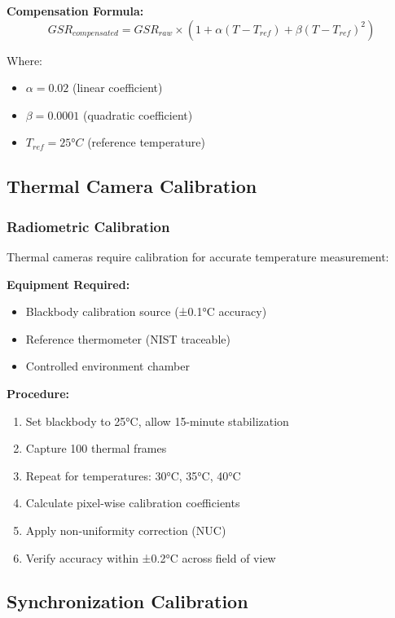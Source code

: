 \textbf{Compensation Formula:}
\begin{equation}
GSR_{compensated} = GSR_{raw} \times (1 + \alpha(T - T_{ref}) + \beta(T - T_{ref})^2)
\end{equation}

Where:
\begin{itemize}
\item $\alpha = 0.02$ (linear coefficient)
\item $\beta = 0.0001$ (quadratic coefficient)
\item $T_{ref} = 25°C$ (reference temperature)
\end{itemize}

\subsection{Thermal Camera Calibration}

\subsubsection{Radiometric Calibration}

Thermal cameras require calibration for accurate temperature measurement:

\textbf{Equipment Required:}
\begin{itemize}
\item Blackbody calibration source (±0.1°C accuracy)
\item Reference thermometer (NIST traceable)
\item Controlled environment chamber
\end{itemize}

\textbf{Procedure:}
\begin{enumerate}
\item Set blackbody to 25°C, allow 15-minute stabilization
\item Capture 100 thermal frames
\item Repeat for temperatures: 30°C, 35°C, 40°C
\item Calculate pixel-wise calibration coefficients
\item Apply non-uniformity correction (NUC)
\item Verify accuracy within ±0.2°C across field of view
\end{enumerate}

\subsection{Synchronization Calibration}

